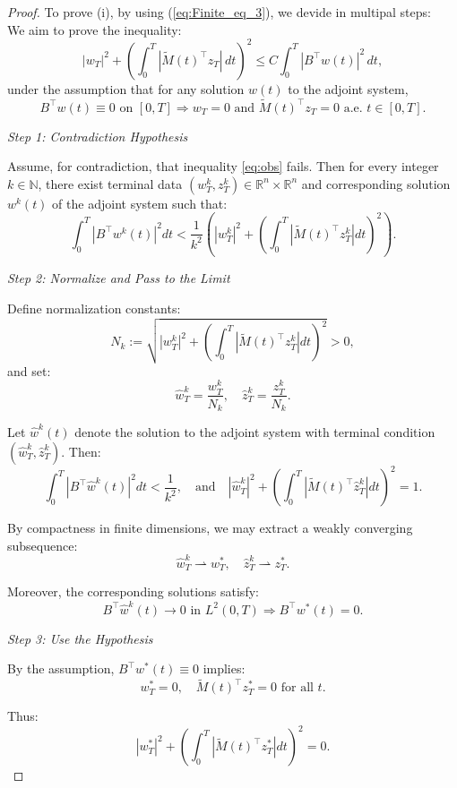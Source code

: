 \documentclass[10pt,a4paper]{amsart}
\begin{document}
\begin{proof}
To prove (i), by  using (\ref{eq:Finite_eq_3}), we devide in multipal steps: \\
We aim to prove the inequality:
\begin{equation}\label{eq:obs}
|w_T|^2 + \left( \int_0^T |\widetilde{M}(t)^\top z_T|\, dt \right)^2 \leq C \int_0^T |B^\top w(t)|^2\, dt,
\end{equation}
under the assumption that for any solution $w(t)$ to the adjoint system,
\[
B^\top w(t) \equiv 0 \text{ on } [0, T] \Rightarrow w_T = 0 \text{ and } \widetilde{M}(t)^\top z_T = 0 \text{ a.e. } t \in [0, T].
\]

\textit{Step 1: Contradiction Hypothesis}

Assume, for contradiction, that inequality \eqref{eq:obs} fails. Then for every integer $k \in \mathbb{N}$, there exist terminal data $(w_T^k, z_T^k) \in \mathbb{R}^n \times \mathbb{R}^n$ and corresponding solution $w^k(t)$ of the adjoint system such that:
\[
\int_0^T |B^\top w^k(t)|^2 dt < \frac{1}{k^2} \left( |w_T^k|^2 + \left( \int_0^T |\widetilde{M}(t)^\top z_T^k| dt \right)^2 \right).
\]

\textit{Step 2: Normalize and Pass to the Limit}

Define normalization constants:
\[
N_k := \sqrt{ |w_T^k|^2 + \left( \int_0^T |\widetilde{M}(t)^\top z_T^k| dt \right)^2 } > 0,
\]
and set:
\[
\hat{w}_T^k = \frac{w_T^k}{N_k}, \quad \hat{z}_T^k = \frac{z_T^k}{N_k}.
\]

Let $\hat{w}^k(t)$ denote the solution to the adjoint system with terminal condition $(\hat{w}_T^k, \hat{z}_T^k)$. Then:
\[
\int_0^T |B^\top \hat{w}^k(t)|^2 dt < \frac{1}{k^2}, \quad \text{and} \quad |\hat{w}_T^k|^2 + \left( \int_0^T |\widetilde{M}(t)^\top \hat{z}_T^k| dt \right)^2 = 1.
\]

By compactness in finite dimensions, we may extract a weakly converging subsequence:
\[
\hat{w}_T^k \rightharpoonup w_T^*, \quad \hat{z}_T^k \rightharpoonup z_T^*.
\]

Moreover, the corresponding solutions satisfy:
\[
B^\top \hat{w}^k(t) \to 0 \text{ in } L^2(0,T) \Rightarrow B^\top w^*(t) = 0.
\]

\textit{Step 3: Use the Hypothesis}

By the assumption, $B^\top w^*(t) \equiv 0$ implies:
\[
w_T^* = 0, \quad \widetilde{M}(t)^\top z_T^* = 0 \text{ for all } t.
\]

Thus:
\[
|w_T^*|^2 + \left( \int_0^T |\widetilde{M}(t)^\top z_T^*| dt \right)^2 = 0.
\]


\end{proof}
\end{document}
